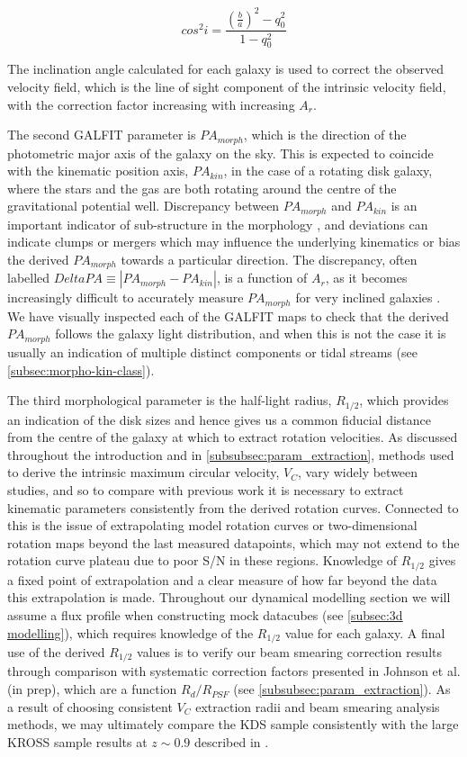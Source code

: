 \documentclass[fleqn,usenatbib]{mn2e}
\begin{document}
\begin{equation}\label{eq:holmberg_i}
   cos^{2}i = \frac{\left(\frac{b}{a}\right)^{2} - q_{0}^{2}}{1 - q_{0}^{2}}
\end{equation}

The inclination angle calculated for each galaxy is used to correct the observed velocity field, which is the line of sight component of the intrinsic velocity field, with the correction factor increasing with increasing $A_{r}$.

The second GALFIT parameter is $PA_{morph}$, which is the direction of the photometric major axis of the galaxy on the sky.
This is expected to coincide with the kinematic position axis, $PA_{kin}$, in the case of a rotating disk galaxy, where the stars and the gas are both rotating around the centre of the gravitational potential well.
Discrepancy between $PA_{morph}$ and $PA_{kin}$ is an important indicator of sub-structure in the morphology \citep{Queyrel2012,Wisnioski2015,Rodrigues2016}, and deviations can indicate clumps or mergers which may influence the underlying kinematics or bias the derived $PA_{morph}$ towards a particular direction. 
The discrepancy, often labelled $Delta PA \equiv |PA_{morph} - PA_{kin}|$, is a function of $A_{r}$, as it becomes increasingly difficult to accurately measure $PA_{morph}$ for very inclined galaxies \citep[e.g.]{Wisnioski2015,Harrison2017}.
We have visually inspected each of the GALFIT maps to check that the derived $PA_{morph}$ follows the galaxy light distribution, and when this is not the case it is usually an indication of multiple distinct components or tidal streams (see \cref{subsec:morpho-kin-class}). 

The third morphological parameter is the half-light radius, $R_{1/2}$, which provides an indication of the disk sizes and hence gives us a common fiducial distance from the centre of the galaxy at which to extract rotation velocities.
As discussed throughout the introduction and in \cref{subsubsec:param_extraction}, methods used to derive the intrinsic maximum circular velocity, $V_{C}$, vary widely between studies, and so to compare with previous work it is necessary to extract kinematic parameters consistently from the derived rotation curves.
Connected to this is the issue of extrapolating model rotation curves or two-dimensional rotation maps beyond the last measured datapoints, which may not extend to the rotation curve plateau due to poor S/N in these regions.
Knowledge of $R_{1/2}$ gives a fixed point of extrapolation and a clear measure of how far beyond the data this extrapolation is made.
Throughout our dynamical modelling section we will assume a flux profile when constructing mock datacubes (see \cref{subsec:3d modelling}), which requires knowledge of the $R_{1/2}$ value for each galaxy.
A final use of the derived $R_{1/2}$ values is to verify our beam smearing correction results through comparison with systematic correction factors presented in Johnson et al. (in prep), which are a function $R_{d} / R_{PSF}$ (see \cref{subsubsec:param_extraction}).
As a result of choosing consistent $V_{C}$ extraction radii and beam smearing analysis methods, we may ultimately compare the KDS sample consistently with the large KROSS sample results at $z \sim 0.9$ described in \citep{Harrison2017}. 
\end{document}
